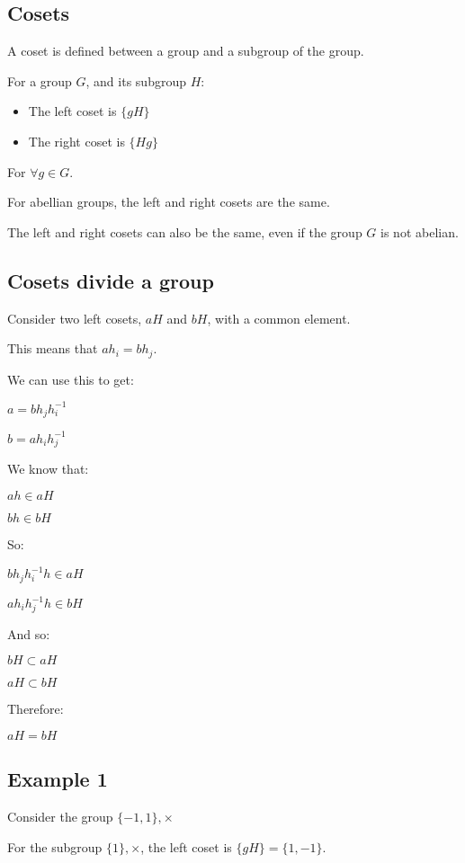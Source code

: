 
\subsection{Cosets}


A coset is defined between a group and a subgroup of the group.

For a group \(G\), and its subgroup \(H\):

\begin{itemize}
\item The left coset is \(\{gH\}\)
\item The right coset is \(\{Hg\}\)
\end{itemize}

For \(\forall g\in G\).

For abellian groups, the left and right cosets are the same.

The left and right cosets can also be the same, even if the group \(G\) is not abelian.

\subsection{Cosets divide a group}

Consider two left cosets, \(aH\) and \(bH\), with a common element.

This means that \(ah_i=bh_j\).

We can use this to get:

\(a=bh_jh_i^{-1}\)

\(b=ah_ih_j^{-1}\)

We know that:

\(ah\in aH\)

\(bh\in bH\)

So:

\(bh_jh_i^{-1}h\in aH\)

\(ah_ih_j^{-1}h\in bH\)

And so:

\(bH\subset aH\)

\(aH\subset bH\)

Therefore:

\(aH=bH\)

\subsection{Example 1}

Consider the group \(\{-1,1\},\times \)

For the subgroup \(\{1\},\times \), the left coset is \(\{gH\}=\{1,-1\}\).

